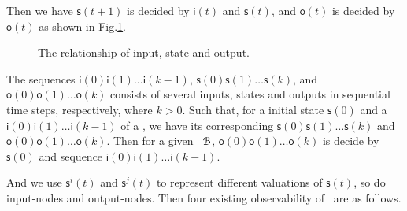  Then we have $\mathsf{s}(t+1)$ is decided by $\mathsf{i}(t)$ and $\mathsf{s}(t)$, and $\mathsf{o}(t)$ is decided by $\mathsf{o}(t)$ as shown in Fig.\ref{fig:10}.


 \begin{figure}[thpb]
      \centering
      
      \caption{The relationship of input, state and output.}
      \label{fig:10}
  \end{figure}
   The sequences $\mathsf{i}(0)\mathsf{i}(1)\ldots\mathsf{i}(k-1)$,  $\mathsf{s}(0)\mathsf{s}(1)\ldots\mathsf{s}(k)$, and $\mathsf{o}(0)\mathsf{o}(1)\ldots\mathsf{o}(k)$ 
 consists of several inputs, states and outputs in sequential time steps,  respectively, where $k>0$. 
 Such that, for a initial state $\mathsf{s}(0)$ and a $\mathsf{i}(0)\mathsf{i}(1)\ldots\mathsf{i}(k-1)$ of a \BCN, we have its corresponding 
$\mathsf{s}(0)\mathsf{s}(1)\ldots\mathsf{s}(k)$ and $\mathsf{o}(0)\mathsf{o}(1)\ldots\mathsf{o}(k)$.  
Then for a given  \BCN\  ${\mathcal{B}}$,  $\mathsf{o}(0)\mathsf{o}(1)\ldots\mathsf{o}(k)$ is decide by
$\mathsf{s}(0)$ and sequence $\mathsf{i}(0)\mathsf{i}(1)\ldots\mathsf{i}(k-1)$. 
 


And we use $\mathsf{s}^{i}(t)$ and $\mathsf{s}^{j}(t)$ to represent different valuations of $\mathsf{s}(t)$, so do input-nodes and output-nodes. Then four existing observability of \BCNs\ are as follows. 


